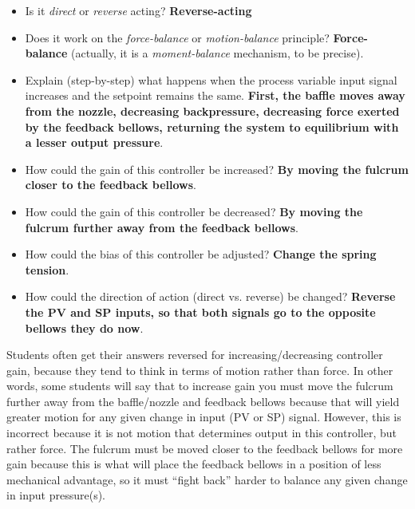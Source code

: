





\begin{itemize}
\item{} Is it {\it direct} or {\it reverse} acting? {\bf Reverse-acting}
\vskip 5pt
\item{} Does it work on the {\it force-balance} or {\it motion-balance} principle? {\bf Force-balance} (actually, it is a {\it moment-balance} mechanism, to be precise).
\vskip 5pt
\item{} Explain (step-by-step) what happens when the process variable input signal increases and the setpoint remains the same. {\bf First, the baffle moves away from the nozzle, decreasing backpressure, decreasing force exerted by the feedback bellows, returning the system to equilibrium with a lesser output pressure}.
\vskip 5pt
\item{} How could the gain of this controller be increased? {\bf By moving the fulcrum closer to the feedback bellows}.
\vskip 5pt
\item{} How could the gain of this controller be decreased? {\bf By moving the fulcrum further away from the feedback bellows}.
\vskip 5pt
\item{} How could the bias of this controller be adjusted? {\bf Change the spring tension}.
\vskip 5pt
\item{} How could the direction of action (direct vs. reverse) be changed?  {\bf Reverse the PV and SP inputs, so that both signals go to the opposite bellows they do now}.
\end{itemize}

\vskip 10pt

Students often get their answers reversed for increasing/decreasing controller gain, because they tend to think in terms of motion rather than force.  In other words, some students will say that to increase gain you must move the fulcrum further away from the baffle/nozzle and feedback bellows because that will yield greater motion for any given change in input (PV or SP) signal.  However, this is incorrect because it is not motion that determines output in this controller, but rather force.  The fulcrum must be moved closer to the feedback bellows for more gain because this is what will place the feedback bellows in a position of less mechanical advantage, so it must ``fight back'' harder to balance any given change in input pressure(s).








